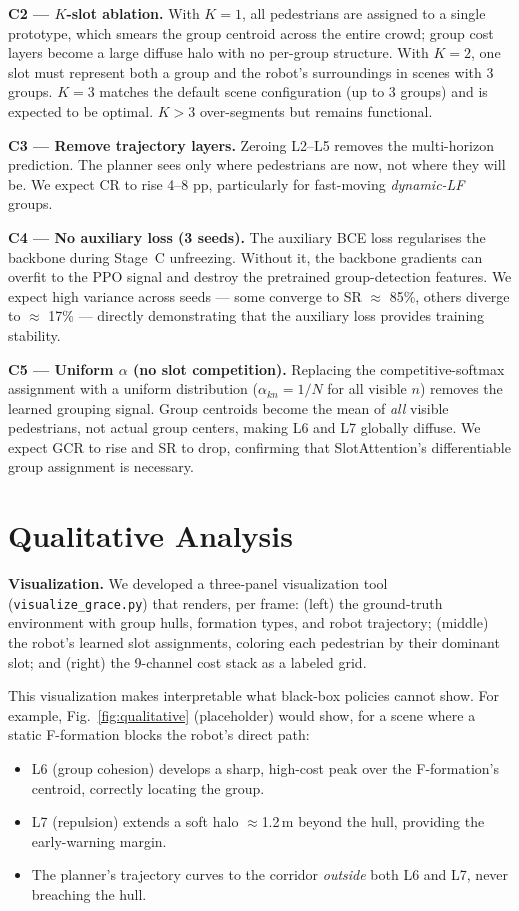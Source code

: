 \documentclass{article}
\begin{document}
\textbf{C2 — $K$-slot ablation.}
With $K=1$, all pedestrians are assigned to a single prototype, which smears
the group centroid across the entire crowd; group cost layers become a large
diffuse halo with no per-group structure.
With $K=2$, one slot must represent both a group and the robot's surroundings
in scenes with 3 groups. $K=3$ matches the default scene configuration
(up to 3 groups) and is expected to be optimal. $K>3$ over-segments but
remains functional.

\textbf{C3 — Remove trajectory layers.}
Zeroing L2–L5 removes the multi-horizon prediction. The planner sees only
where pedestrians are now, not where they will be. We expect CR to rise
4–8 pp, particularly for fast-moving \emph{dynamic-LF} groups.

\textbf{C4 — No auxiliary loss (3 seeds).}
The auxiliary BCE loss regularises the backbone during Stage~C unfreezing.
Without it, the backbone gradients can overfit to the PPO signal and destroy
the pretrained group-detection features.
We expect high variance across seeds — some converge to SR $\approx$ 85\%,
others diverge to $\approx$ 17\% — directly demonstrating that the auxiliary
loss provides training stability.

\textbf{C5 — Uniform $\alpha$ (no slot competition).}
Replacing the competitive-softmax assignment with a uniform distribution
($\alpha_{kn} = 1/N$ for all visible $n$) removes the learned grouping signal.
Group centroids become the mean of \emph{all} visible pedestrians, not actual
group centers, making L6 and L7 globally diffuse.
We expect GCR to rise and SR to drop, confirming that SlotAttention's
differentiable group assignment is necessary.

\section{Qualitative Analysis}
\label{sec:qualitative}

\textbf{Visualization.}
We developed a three-panel visualization tool (\texttt{visualize\_grace.py})
that renders, per frame: (left) the ground-truth environment with group hulls,
formation types, and robot trajectory; (middle) the robot's learned slot
assignments, coloring each pedestrian by their dominant slot; and (right)
the 9-channel cost stack as a labeled grid.

This visualization makes interpretable what black-box policies cannot show.
For example, Fig.~\ref{fig:qualitative} (placeholder) would show, for a scene
where a static F-formation blocks the robot's direct path:
\begin{itemize}\setlength\itemsep{0pt}
  \item L6 (group cohesion) develops a sharp, high-cost peak over the
        F-formation's centroid, correctly locating the group.
  \item L7 (repulsion) extends a soft halo $\approx$1.2\,m beyond the hull,
        providing the early-warning margin.
  \item The planner's trajectory curves to the corridor \emph{outside}
        both L6 and L7, never breaching the hull.
\end{itemize}
\end{document}
